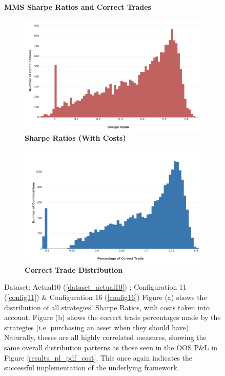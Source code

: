 \documentclass[a4paper,11pt,oneside]{article}
\theoremstyle{plain}
\theoremstyle{definition}
\begin{document}
	
	\begin{figure}[H]
		\centering
		\textbf{MMS Sharpe Ratios and Correct Trades}
		\begin{subfigure}{.44\textwidth}
			\centering 
			\includegraphics[scale=0.23]{images/results/mms/sharpe_ratios.png} 
			\caption{\textbf{Sharpe Ratios (With Costs)}}
			\label{figure-sharpe_ratios}
		\end{subfigure}%
		\begin{subfigure}{.5\textwidth}
			\includegraphics[scale=0.22]{images/results/mms/confusion_dist.png} 
			\caption{\textbf{Correct Trade Distribution}}
			\label{figure-confusion_dist}
		\end{subfigure}
		\caption[MMS Sharpe Ratios and Correct Trades]{Dataset: Actual10 (\ref{dataset_actual10}) ; Configuration 11 (\ref{config11}) \&  Configuration 16 (\ref{config16})
			\newline Figure (a) shows the distribution of all strategies' Sharpe Ratios, with costs taken into account. Figure (b) shows the correct trade percentages made by the strategies (i.e. purchasing an asset when they should have). Naturally, theses are all highly correlated measures, showing the same overall distribution patterns as those seen in the OOS P\&L in Figure \ref{results_pl_pdf_cost}. This once again indicates the successful implementation of the underlying framework.
		}
		\label{results_mms_sr_conf}
	\end{figure}
\end{document}
